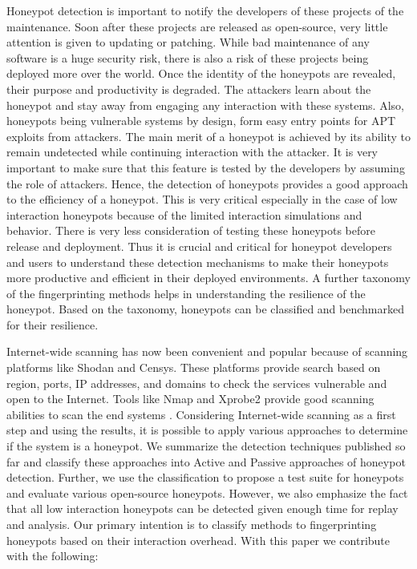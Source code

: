 Honeypot detection is important to notify the developers of these projects of the maintenance. Soon after these projects are released as open-source, very little attention is given to updating or patching. While bad maintenance of any software is a huge security risk, there is also a risk of these projects being deployed more over the world. Once the identity of the honeypots are revealed, their purpose and productivity is degraded. The attackers learn about the honeypot and stay away from engaging any interaction with these systems. Also, honeypots being vulnerable systems by design, form easy entry points for APT exploits from attackers. The main merit of a honeypot is achieved by its ability to remain undetected while continuing interaction with the attacker. It is very important to make sure that this feature is tested by the developers by assuming the role of attackers. Hence, the detection of honeypots provides a good approach to the efficiency of a honeypot. This is very critical especially in the case of low interaction honeypots because of the limited interaction simulations and behavior. There is very less consideration of testing these honeypots before release and deployment. Thus it is crucial and critical for honeypot developers and users to understand these detection mechanisms to make their honeypots more productive and efficient in their deployed environments. A further taxonomy of the fingerprinting methods helps in understanding the resilience of the honeypot. Based on the taxonomy, honeypots can be classified and benchmarked for their resilience. 


Internet-wide scanning has now been convenient and popular because of scanning platforms like Shodan and Censys. These platforms provide search based on region, ports, IP addresses, and domains to check the services vulnerable and open to the Internet. Tools like Nmap and Xprobe2 provide good scanning abilities to scan the end systems\cite{NMap} . Considering Internet-wide scanning as a first step and using the results, it is possible to apply various approaches to determine if the system is a honeypot. We summarize the detection techniques published so far and classify these approaches into Active and Passive approaches of honeypot detection. Further, we use the classification to propose a test suite for honeypots and evaluate various open-source honeypots. However, we also emphasize the fact that all low interaction honeypots can be detected given enough time for replay and analysis. Our primary intention is to classify methods to fingerprinting honeypots based on their interaction overhead. With this paper we contribute with the following:

